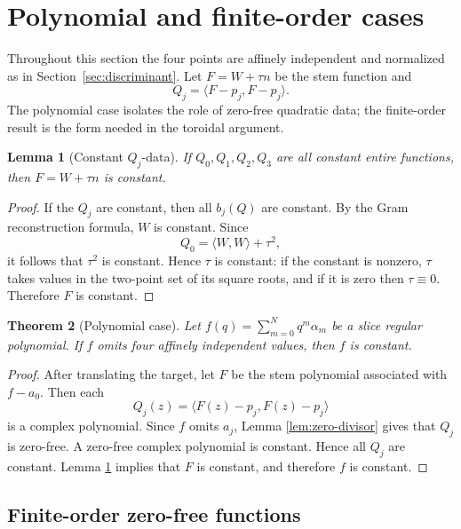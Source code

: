 \documentclass[11pt]{amsart}
\numberwithin{equation}{section}
\newtheorem{theorem}{Theorem}[section]
\newtheorem{lemma}[theorem]{Lemma}
\theoremstyle{definition}
\theoremstyle{remark}
\begin{document}
\section{Polynomial and finite-order cases}
\label{sec:finite-order}

Throughout this section the four points are affinely independent and normalized as in Section~\ref{sec:discriminant}. Let $F=W+\tau n$ be the stem function and
\[
Q_j=\langle F-p_j,F-p_j\rangle.
\]
The polynomial case isolates the role of zero-free quadratic data; the finite-order result is the form needed in the toroidal argument.

\begin{lemma}[Constant $Q_j$-data]\label{lem:constant-data}
If $Q_0,Q_1,Q_2,Q_3$ are all constant entire functions, then $F=W+\tau n$ is constant.
\end{lemma}

\begin{proof}
If the $Q_j$ are constant, then all $b_j(Q)$ are constant. By the Gram reconstruction formula, $W$ is constant. Since
\[
Q_0=\langle W,W\rangle+\tau^2,
\]
it follows that $\tau^2$ is constant. Hence $\tau$ is constant: if the constant is nonzero, $\tau$ takes values in the two-point set of its square roots, and if it is zero then $\tau\equiv0$. Therefore $F$ is constant.
\end{proof}

\begin{theorem}[Polynomial case]\label{thm:polynomial-case}
Let $f(q)=\sum_{m=0}^Nq^m\alpha_m$ be a slice regular polynomial. If $f$ omits four affinely independent values, then $f$ is constant.
\end{theorem}

\begin{proof}
After translating the target, let $F$ be the stem polynomial associated with $f-a_0$. Then each
\[
Q_j(z)=\langle F(z)-p_j,F(z)-p_j\rangle
\]
is a complex polynomial. Since $f$ omits $a_j$, Lemma \ref{lem:zero-divisor} gives that $Q_j$ is zero-free. A zero-free complex polynomial is constant. Hence all $Q_j$ are constant. Lemma \ref{lem:constant-data} implies that $F$ is constant, and therefore $f$ is constant.
\end{proof}

\subsection{Finite-order zero-free functions}
\end{document}
